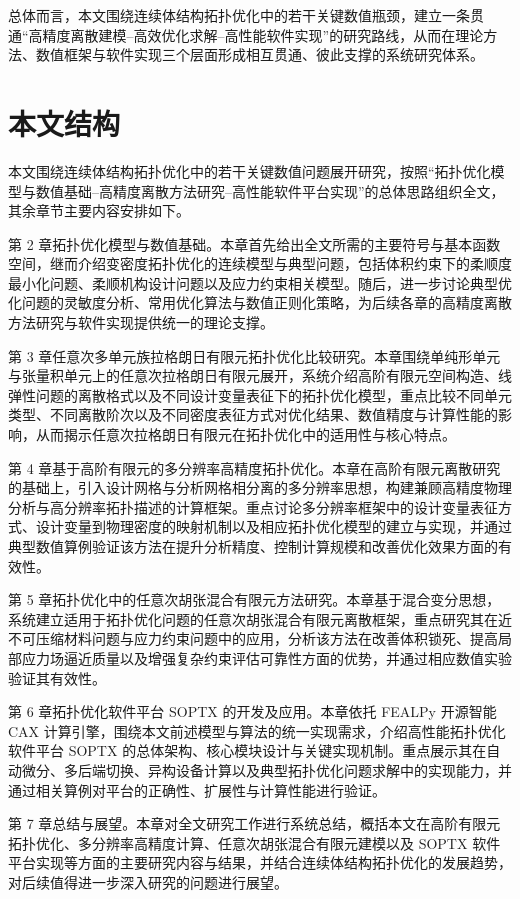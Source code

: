 总体而言，本文围绕连续体结构拓扑优化中的若干关键数值瓶颈，建立一条贯通“高精度离散建模--高效优化求解--高性能软件实现”的研究路线，从而在理论方法、数值框架与软件实现三个层面形成相互贯通、彼此支撑的系统研究体系。


\section{本文结构}
\label{sec:thesis_structure}

本文围绕连续体结构拓扑优化中的若干关键数值问题展开研究，按照“拓扑优化模型与数值基础--高精度离散方法研究--高性能软件平台实现”的总体思路组织全文，其余章节主要内容安排如下。

第 2 章拓扑优化模型与数值基础。本章首先给出全文所需的主要符号与基本函数空间，继而介绍变密度拓扑优化的连续模型与典型问题，包括体积约束下的柔顺度最小化问题、柔顺机构设计问题以及应力约束相关模型。随后，进一步讨论典型优化问题的灵敏度分析、常用优化算法与数值正则化策略，为后续各章的高精度离散方法研究与软件实现提供统一的理论支撑。

第 3 章任意次多单元族拉格朗日有限元拓扑优化比较研究。本章围绕单纯形单元与张量积单元上的任意次拉格朗日有限元展开，系统介绍高阶有限元空间构造、线弹性问题的离散格式以及不同设计变量表征下的拓扑优化模型，重点比较不同单元类型、不同离散阶次以及不同密度表征方式对优化结果、数值精度与计算性能的影响，从而揭示任意次拉格朗日有限元在拓扑优化中的适用性与核心特点。

第 4 章基于高阶有限元的多分辨率高精度拓扑优化。本章在高阶有限元离散研究的基础上，引入设计网格与分析网格相分离的多分辨率思想，构建兼顾高精度物理分析与高分辨率拓扑描述的计算框架。重点讨论多分辨率框架中的设计变量表征方式、设计变量到物理密度的映射机制以及相应拓扑优化模型的建立与实现，并通过典型数值算例验证该方法在提升分析精度、控制计算规模和改善优化效果方面的有效性。

第 5 章拓扑优化中的任意次胡张混合有限元方法研究。本章基于混合变分思想，系统建立适用于拓扑优化问题的任意次胡张混合有限元离散框架，重点研究其在近不可压缩材料问题与应力约束问题中的应用，分析该方法在改善体积锁死、提高局部应力场逼近质量以及增强复杂约束评估可靠性方面的优势，并通过相应数值实验验证其有效性。

第 6 章拓扑优化软件平台 SOPTX 的开发及应用。本章依托 FEALPy 开源智能 CAX 计算引擎，围绕本文前述模型与算法的统一实现需求，介绍高性能拓扑优化软件平台 SOPTX 的总体架构、核心模块设计与关键实现机制。重点展示其在自动微分、多后端切换、异构设备计算以及典型拓扑优化问题求解中的实现能力，并通过相关算例对平台的正确性、扩展性与计算性能进行验证。

第 7 章总结与展望。本章对全文研究工作进行系统总结，概括本文在高阶有限元拓扑优化、多分辨率高精度计算、任意次胡张混合有限元建模以及 SOPTX 软件平台实现等方面的主要研究内容与结果，并结合连续体结构拓扑优化的发展趋势，对后续值得进一步深入研究的问题进行展望。


